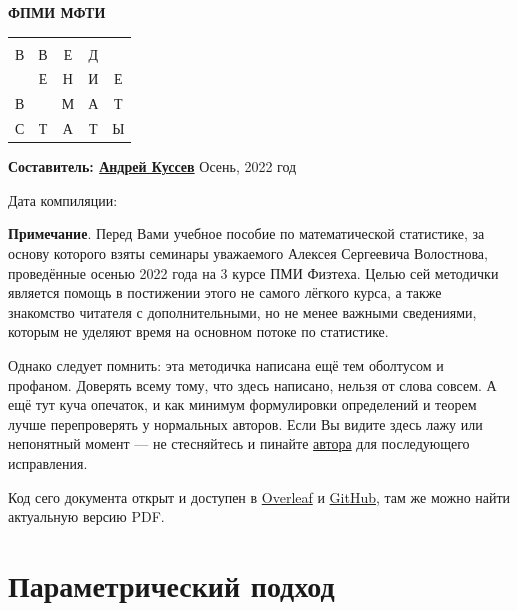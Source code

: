 \documentclass[12pt, a4paper, num=]{tools/listok}
\begin{document}
\begin{titlepage}
	\clearpage\thispagestyle{empty}
	\centering
	\textbf{ФПМИ МФТИ}
    {\fontsize{85}{107}\selectfont\bf
    \begin{center}
    \begin{tabular}{ccccc}
    \phantom{M}&\phantom{M}&\phantom{M}&\phantom{M}&\phantom{M}\\
        В & В & Е & Д &  \\
          & Е & Н & И & Е\\
        В &   & М & А & Т\\
        С & Т & А & Т & Ы
    \end{tabular}
    \end{center}
    }
    \vfill
    { {\textbf{{%
    Составитель: \href{https://vk.com/andkus}{Андрей Куссев}
    }}}}
	\vfill
    Осень, 2022 год
    
    Дата компиляции:
    
    \DTMToday
	\pagebreak
	
\end{titlepage}

\setlength{\abovedisplayskip}{5pt plus 2pt minus 2pt}
\setlength{\belowdisplayskip}{5pt plus 2pt minus 2pt}
\hypertarget{intro}{}
\tableofcontents
\vspace{10pt}
\textbf{Примечание}. Перед Вами учебное пособие по математической статистике, за основу которого взяты семинары уважаемого Алексея Сергеевича Волостнова, проведённые осенью 2022 года на 3 курсе ПМИ Физтеха. Целью сей методички является помощь в постижении этого не самого лёгкого курса, а также знакомство читателя с дополнительными, но не менее важными сведениями, которым не уделяют время на основном потоке по статистике.

Однако следует помнить: эта методичка написана ещё тем оболтусом и профаном. Доверять всему тому, что здесь написано, нельзя от слова совсем. А ещё тут куча опечаток, и как минимум формулировки определений и теорем лучше перепроверять у нормальных авторов. Если Вы видите здесь лажу или непонятный момент ---  не стесняйтесь и пинайте \href{https://vk.com/andkus}{автора} для последующего исправления.

Код сего документа открыт и доступен в \href{https://www.overleaf.com/read/tdmvvfrmgzks#053aa4}{Overleaf} и \href{https://github.com/akussev/stats_intro}{GitHub}, там же можно найти актуальную версию PDF.

\newpage
 \setcounter{section}{-1}
 
 \newpage
\part{Параметрический подход}






\newpage
\end{document}
